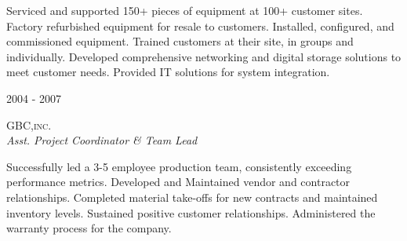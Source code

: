 \documentclass[11pt]{article} %
\begin{document}
\begin{minipage}[t]{0.5\textwidth}
\normalsize{Serviced and supported 150+ pieces of equipment at 100+ customer sites. Factory refurbished equipment for resale to customers. Installed, configured, and commissioned equipment. Trained customers at their site, in groups and individually. Developed comprehensive networking and digital storage solutions to meet customer needs. Provided IT solutions for system integration.}\\


{\raggedleft\textsc{2004 - 2007}\par}

{\raggedright\large\textsc{GBC,inc.}\\
\textit{Asst. Project Coordinator \& Team Lead}\\[5pt]}

\normalsize{Successfully led a 3-5 employee production team, consistently exceeding performance metrics. Developed and Maintained vendor and contractor relationships. Completed material take-offs for new contracts and maintained inventory levels. Sustained positive customer relationships. Administered the warranty process for the company.}\\





\end{minipage} %
\hfill
\end{document}
